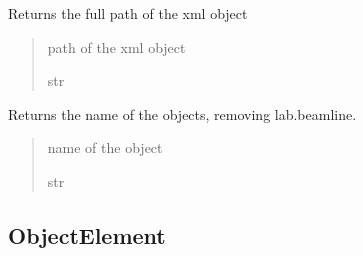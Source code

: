 \documentclass[letterpaper,10pt,english]{sphinxmanual}
\begin{document}
\begin{fulllineitems}
\begin{fulllineitems}
\end{fulllineitems}


\begin{fulllineitems}
\label{\detokenize{API:raypyng.rml.BeamlineElement.get_full_path}}
\pysigstartsignatures
{}
\pysigstopsignatures
\sphinxAtStartPar
Returns the full path of the xml object
\begin{quote}\begin{description}
\sphinxAtStartPar
path of the xml object

\sphinxAtStartPar
str

\end{description}\end{quote}

\end{fulllineitems}


\begin{fulllineitems}
\label{\detokenize{API:raypyng.rml.BeamlineElement.resolvable_name}}
\pysigstartsignatures
{}
\pysigstopsignatures
\sphinxAtStartPar
Returns the name of the objects, removing lab.beamline.
\begin{quote}\begin{description}
\sphinxAtStartPar
name of the object

\sphinxAtStartPar
str

\end{description}\end{quote}

\end{fulllineitems}


\end{fulllineitems}



\subsection{ObjectElement}
\label{\detokenize{API:objectelement}}
\end{document}
